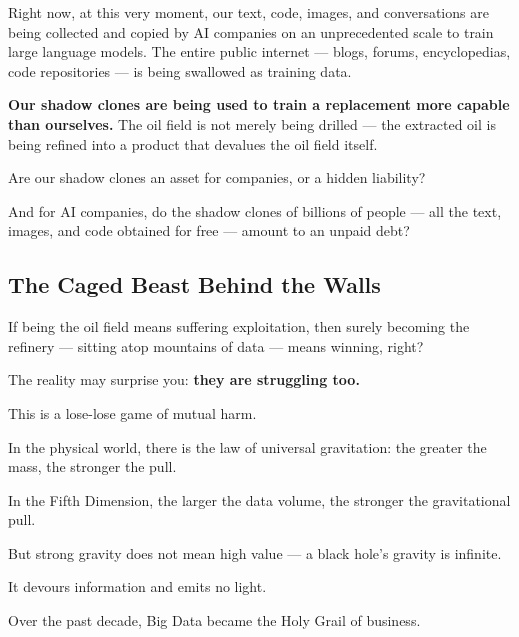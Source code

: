 Right now, at this very moment, our text, code, images, and conversations are being collected and copied by AI companies on an unprecedented scale to train large language models. The entire public internet --- blogs, forums, encyclopedias, code repositories --- is being swallowed as training data.

\vspace{1em}

\textbf{Our shadow clones are being used to train a replacement more capable than ourselves.}
The oil field is not merely being drilled --- the extracted oil is being refined into a product that devalues the oil field itself.

\begin{thinkbox}
Are our shadow clones an asset for companies, or a hidden liability?

And for AI companies, do the shadow clones of billions of people --- all the text, images, and code obtained for free --- amount to an unpaid debt?
\end{thinkbox}


\newpage
\subsection{The Caged Beast Behind the Walls}

If being the oil field means suffering exploitation, then surely becoming the refinery --- sitting atop mountains of data --- means winning, right?

\vspace{1em}

The reality may surprise you: \textbf{they are struggling too.}

This is a lose-lose game of mutual harm.

\vspace{1em}

In the physical world, there is the law of universal gravitation: the greater the mass, the stronger the pull.

In the Fifth Dimension, the larger the data volume, the stronger the gravitational pull.

But strong gravity does not mean high value --- a black hole's gravity is infinite.

It devours information and emits no light.

\vspace{1em}

Over the past decade, Big Data became the Holy Grail of business.

